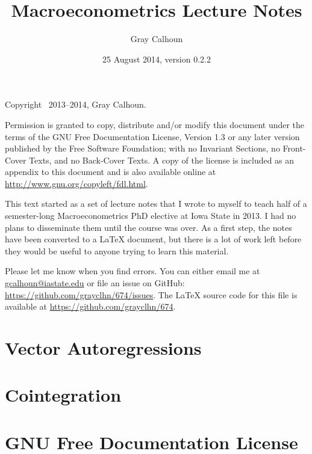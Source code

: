 \documentclass[12pt,notitlepage]{report}
\title{Macroeconometrics Lecture Notes}
\author{Gray Calhoun}
\date{25 August 2014, version 0.2.2}
\begin{document}
\maketitle

\bigskip\noindent%
Copyright \textcopyright\ 2013--2014, Gray Calhoun.

Permission is granted to copy, distribute and/or modify this document
under the terms of the GNU Free Documentation License, Version 1.3 or
any later version published by the Free Software Foundation; with no
Invariant Sections, no Front-Cover Texts, and no Back-Cover Texts.  A
copy of the license is included as an appendix to this document and is
also available online at \url{http://www.gnu.org/copyleft/fdl.html}.

This text started as a set of lecture notes that I
wrote to myself to teach half of a semester-long Macroeconometrics PhD
elective at Iowa State in 2013.  I had no plans to disseminate them
until the course was over.  As a first step, the notes have been
converted to a LaTeX document, but there is a lot of work left
before they would be useful to anyone trying to learn this material.

Please let me know when you find errors. You can either email me at
\url{gcalhoun@iastate.edu} or file an issue on GitHub:
\url{https://github.com/grayclhn/674/issues}. The LaTeX source code
for this file is available at \url{https://github.com/grayclhn/674}.

\tableofcontents
{}
\newpage

\chapter{Vector Autoregressions}





\chapter{Cointegration}




\chapter*{GNU Free Documentation License}



\end{document}
